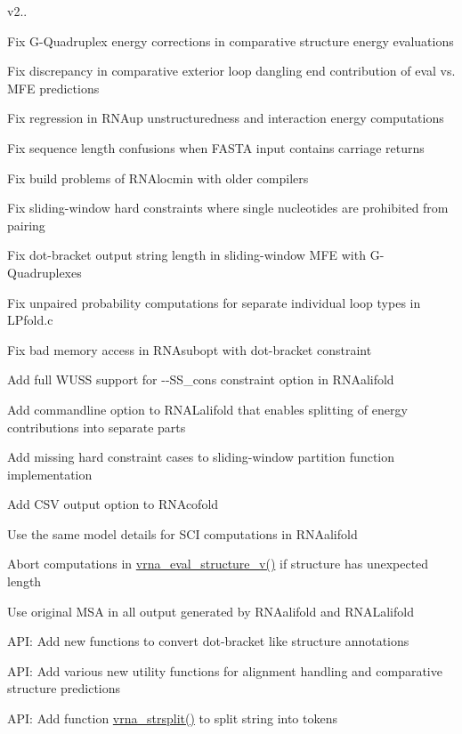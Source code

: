 v2..
\begin{DoxyItemize}
\item Fix G-\/\+Quadruplex energy corrections in comparative structure energy evaluations
\item Fix discrepancy in comparative exterior loop dangling end contribution of eval vs. M\+FE predictions
\item Fix regression in R\+N\+Aup unstructuredness and interaction energy computations
\item Fix sequence length confusions when F\+A\+S\+TA input contains carriage returns
\item Fix build problems of R\+N\+Alocmin with older compilers
\item Fix sliding-\/window hard constraints where single nucleotides are prohibited from pairing
\item Fix dot-\/bracket output string length in sliding-\/window M\+FE with G-\/\+Quadruplexes
\item Fix unpaired probability computations for separate individual loop types in L\+Pfold.\+c
\item Fix bad memory access in R\+N\+Asubopt with dot-\/bracket constraint
\item Add full W\+U\+SS support for -\/-\/\+S\+S\+\_\+cons constraint option in R\+N\+Aalifold
\item Add commandline option to R\+N\+A\+Lalifold that enables splitting of energy contributions into separate parts
\item Add missing hard constraint cases to sliding-\/window partition function implementation
\item Add C\+SV output option to R\+N\+Acofold
\item Use the same model details for S\+CI computations in R\+N\+Aalifold
\item Abort computations in \mbox{\hyperlink{group__eval_gab12e6b1226227670322150df018734f8}{vrna\+\_\+eval\+\_\+structure\+\_\+v()}} if structure has unexpected length
\item Use original M\+SA in all output generated by R\+N\+Aalifold and R\+N\+A\+Lalifold
\item A\+PI\+: Add new functions to convert dot-\/bracket like structure annotations
\item A\+PI\+: Add various new utility functions for alignment handling and comparative structure predictions
\item A\+PI\+: Add function \mbox{\hyperlink{group__string__utils_gac632775617f4b2df096bfe8efb53d07f}{vrna\+\_\+strsplit()}} to split string into tokens

\end{DoxyItemize}
